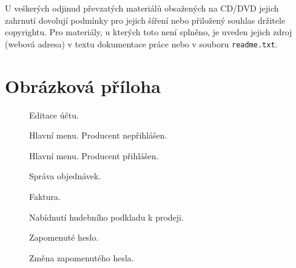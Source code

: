 \documentclass[12pt]{article}
\begin{document}
U veškerých odjinud převzatých materiálů obsažených na CD/DVD jejich
zahrnutí dovolují podmínky pro jejich šíření nebo přiložený souhlas
držitele copyrightu. Pro materiály, u kterých toto není splněno, je
uveden jejich zdroj (webová adresa) v textu dokumentace práce nebo v
souboru \texttt{readme.txt}.

\section{Obrázková příloha} \label{pictures}

\begin{figure}[h!]
  \caption{Editace účtu.} \label{pic:editacc}
\end{figure}

\begin{figure}[h!]
  \caption{Hlavní menu. Producent nepřihlášen.} \label{pic:menulogout}
\end{figure}

\begin{figure}[h!]
  \caption{Hlavní menu.  Producent přihlášen.} \label{pic:menulogin}
\end{figure}

\begin{figure}[h!]
  \caption{Správa objednávek.} \label{pic:orders}
\end{figure}

\begin{figure}[h!]
  \caption{Faktura.} \label{pic:invoice}
\end{figure}

\begin{figure}[h!]
  \caption{Nabídnutí hudebního podkladu k prodeji.} \label{pic:edittrack}
\end{figure}

\begin{figure}[h!]
  \centerline{}
  \caption{Zapomenuté heslo.} \label{pic:forgotten}
\end{figure}

\begin{figure}[h!]
  \centerline{}
  \caption{Změna zapomenutého hesla.} \label{pic:pwdreset}
\end{figure}
\end{document}
